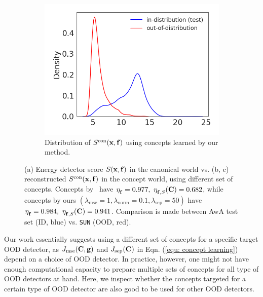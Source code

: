 \begin{figure}
  \hfill
  \begin{subfigure}{0.32\linewidth}
    \includegraphics[width=\textwidth]{figures/distr_energy_ours.png}
    \caption{\small Distribution of $S^{\textrm{con}}(\mathbf{x}, \mathbf{f})$ using concepts learned by our method.}
    \label{fig:short-c1}
  \end{subfigure}
  \caption{
  \small (a) Energy detector score $S(\mathbf{x}, \mathbf{f})$ in the canonical world vs. (b, c) reconstructed $S^{\textrm{con}}(\mathbf{x}, \mathbf{f})$ in the concept world, using different set of concepts.
  Concepts by~\citet{yeh2020completeness} have $\eta^{}_{\mathbf{f}} = 0.977, ~\eta^{}_{\mathbf{f}, S}(\mathbf{C}) = 0.682$, while concepts by ours $(\lambda_\textrm{mse} = 1, \lambda_\textrm{norm} = 0.1, \lambda_\textrm{sep} = 50)$ have $\eta^{}_{\mathbf{f}} = 0.984, ~\eta^{}_{\mathbf{f}, S}(\mathbf{C}) = 0.941$.
    Comparison is made between AwA test set (ID, blue) vs. \texttt{SUN} (OOD, red).
    }
\label{fig:score-distribution-energy}
\end{figure}

\iffalse
{}
\label{sec:appendix-concept-learning-transfer}
Our work essentially suggests using a different set of concepts for a specific target OOD detector, as $J_{\textrm{mse}}(\mathbf{C}, \mathbf{g})$ and $J_{\textrm{sep}}(\mathbf{C})$ in Eqn. (\ref{equ: concept learning}) depend on a choice of OOD detector. 
In practice, however, one might not have enough computational capacity to prepare multiple sets of concepts for all type of OOD detectors at hand.
Here, we inspect whether the concepts targeted for a certain type of OOD detector are also good to be used for other OOD detectors.


